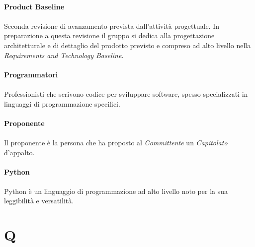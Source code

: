 \documentclass[10pt, a4paper]{article}
\begin{document}
\paragraph{Product Baseline}\noindent\hrulefill
\paragraph{}Seconda revisione di avanzamento prevista dall’attività progettuale. In preparazione a questa revisione il gruppo si dedica alla progettazione architetturale e di dettaglio del prodotto previsto e compreso ad alto livello nella \textit{Requirements and Technology Baseline\pg}.

\vspace{2em}
\paragraph{Programmatori}\noindent\hrulefill
\paragraph{}Professionisti che scrivono codice per sviluppare software, spesso specializzati in linguaggi di programmazione specifici.




\vspace{2em}
\paragraph{Proponente}\noindent\hrulefill
\paragraph{}Il proponente è la persona che ha proposto al \textit{Committente\pg} un \textit{Capitolato\pg}
d’appalto.



\vspace{2em}
\paragraph{Python}\noindent\hrulefill
\paragraph{}Python è un linguaggio di programmazione ad alto livello noto per la sua leggibilità e versatilità.


\newpage
\section{Q}
\vspace{2em}
\end{document}
